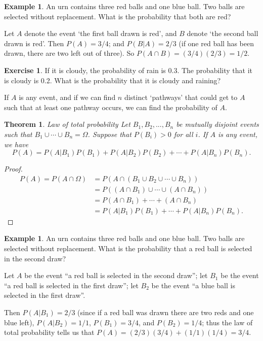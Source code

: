 \documentclass[a4paper,leqno]{article}
\numberwithin{equation}{section}
\newtheorem{thm}[equation]{Theorem}
\theoremstyle{definition}
\newtheorem{ex}[equation]{Example}
\newtheorem{exercise}[equation]{Exercise}
\theoremstyle{remark}
\newcommand{\union}{\cup}
\newcommand{\inter}{\cap}
\begin{document}
\begin{ex}
  An urn contains three red balls and one blue ball. Two balls are selected without replacement. What is the probability that both are red?

  Let $ A $ denote the event `the first ball drawn is red', and $ B $ denote `the second ball drawn is red'. Then $ P(A) = 3/4 $;
  and $ P(B | A) = 2/3 $ (if one red ball has been drawn, there are two left out of three). So $ P(A \inter B) = (3/4)(2/3) = 1/2 $.
\end{ex}

\begin{exercise}
  If it is cloudy, the probability of rain is 0.3. The probability that it is cloudy is 0.2. What is the probability
  that it is cloudy and raining?
\end{exercise}

If $ A $ is any event, and if we can find $ n $ distinct `pathways' that could get to $ A $ such that at least one pathway occurs, we can
find the probability of $ A $.

\begin{thm}{Law of total probability}
  Let $ B_1, B_2,...,B_n $ be mutually disjoint events such that $ B_1 \union \cdots \union B_n = \Omega $. Suppose that $ P(B_i) > 0 $
  for all $ i $. If $ A $ is any event, we have
  \begin{displaymath}
    P(A) = P(A | B_1) P(B_1) + P(A | B_2) P(B_2) + \cdots + P(A | B_n) P(B_n).
  \end{displaymath}
\end{thm}
\begin{proof}
  \begin{align*}
    P(A) = P(A \inter \Omega) &= P\left(A \inter (B_1 \union B_2 \union \cdots \union B_n)\right)\\
                              &= P\left((A \inter B_1) \union \cdots \union (A \inter B_n)\right)\\
                              &= P(A \inter B_1) + \cdots + {(A \inter B_n)}\\
                              &= P(A | B_1) P(B_1) + \cdots + P(A | B_n) P(B_n).
  \end{align*}
\end{proof}

\begin{ex}\label{ex:totalprob1}
  An urn contains three red balls and one blue ball. Two balls are selected without replacement. What is the probability that
  a red ball is selected in the second draw?

  Let $ A $ be the event ``a red ball is selected in the second draw''; let $ B_1 $ be the event ``a red ball is selected
  in the first draw''; let $ B_2 $ be the event ``a blue ball is selected in the first draw''.

  Then $ P(A|B_1) = 2/3 $ (since if a red ball was drawn there are two reds and one blue left), $ P(A | B_2) = 1/1 $,
  $ P(B_1) = 3/4 $, and $ P(B_2) = 1/4 $; thus the law of total probability tells us that $ P(A) = (2/3)(3/4) + (1/1)(1/4) = 3/4 $.
\end{ex}
\end{document}
